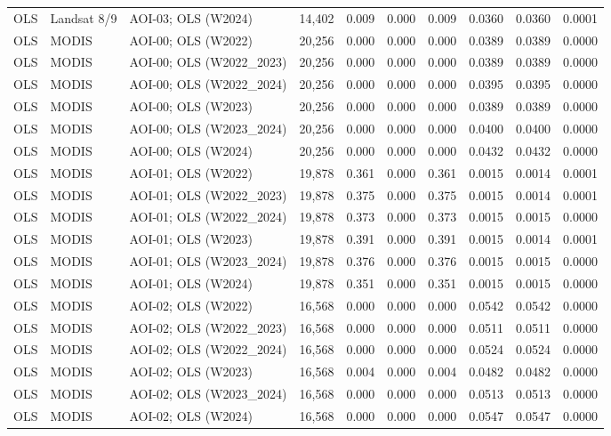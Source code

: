 \begin{landscape}
\begin{longtable}{lllrrrrrrr}
OLS & Landsat 8/9 & AOI-03; OLS (W2024) & 14,402 & 0.009 & 0.000 & 0.009 & 0.0360 & 0.0360 & 0.0001 \\
OLS & MODIS & AOI-00; OLS (W2022) & 20,256 & 0.000 & 0.000 & 0.000 & 0.0389 & 0.0389 & 0.0000 \\
OLS & MODIS & AOI-00; OLS (W2022\_2023) & 20,256 & 0.000 & 0.000 & 0.000 & 0.0389 & 0.0389 & 0.0000 \\
OLS & MODIS & AOI-00; OLS (W2022\_2024) & 20,256 & 0.000 & 0.000 & 0.000 & 0.0395 & 0.0395 & 0.0000 \\
OLS & MODIS & AOI-00; OLS (W2023) & 20,256 & 0.000 & 0.000 & 0.000 & 0.0389 & 0.0389 & 0.0000 \\
OLS & MODIS & AOI-00; OLS (W2023\_2024) & 20,256 & 0.000 & 0.000 & 0.000 & 0.0400 & 0.0400 & 0.0000 \\
OLS & MODIS & AOI-00; OLS (W2024) & 20,256 & 0.000 & 0.000 & 0.000 & 0.0432 & 0.0432 & 0.0000 \\
OLS & MODIS & AOI-01; OLS (W2022) & 19,878 & 0.361 & 0.000 & 0.361 & 0.0015 & 0.0014 & 0.0001 \\
OLS & MODIS & AOI-01; OLS (W2022\_2023) & 19,878 & 0.375 & 0.000 & 0.375 & 0.0015 & 0.0014 & 0.0001 \\
OLS & MODIS & AOI-01; OLS (W2022\_2024) & 19,878 & 0.373 & 0.000 & 0.373 & 0.0015 & 0.0015 & 0.0000 \\
OLS & MODIS & AOI-01; OLS (W2023) & 19,878 & 0.391 & 0.000 & 0.391 & 0.0015 & 0.0014 & 0.0001 \\
OLS & MODIS & AOI-01; OLS (W2023\_2024) & 19,878 & 0.376 & 0.000 & 0.376 & 0.0015 & 0.0015 & 0.0000 \\
OLS & MODIS & AOI-01; OLS (W2024) & 19,878 & 0.351 & 0.000 & 0.351 & 0.0015 & 0.0015 & 0.0000 \\
OLS & MODIS & AOI-02; OLS (W2022) & 16,568 & 0.000 & 0.000 & 0.000 & 0.0542 & 0.0542 & 0.0000 \\
OLS & MODIS & AOI-02; OLS (W2022\_2023) & 16,568 & 0.000 & 0.000 & 0.000 & 0.0511 & 0.0511 & 0.0000 \\
OLS & MODIS & AOI-02; OLS (W2022\_2024) & 16,568 & 0.000 & 0.000 & 0.000 & 0.0524 & 0.0524 & 0.0000 \\
OLS & MODIS & AOI-02; OLS (W2023) & 16,568 & 0.004 & 0.000 & 0.004 & 0.0482 & 0.0482 & 0.0000 \\
OLS & MODIS & AOI-02; OLS (W2023\_2024) & 16,568 & 0.000 & 0.000 & 0.000 & 0.0513 & 0.0513 & 0.0000 \\
OLS & MODIS & AOI-02; OLS (W2024) & 16,568 & 0.000 & 0.000 & 0.000 & 0.0547 & 0.0547 & 0.0000 \\

\end{longtable}
\end{landscape}
